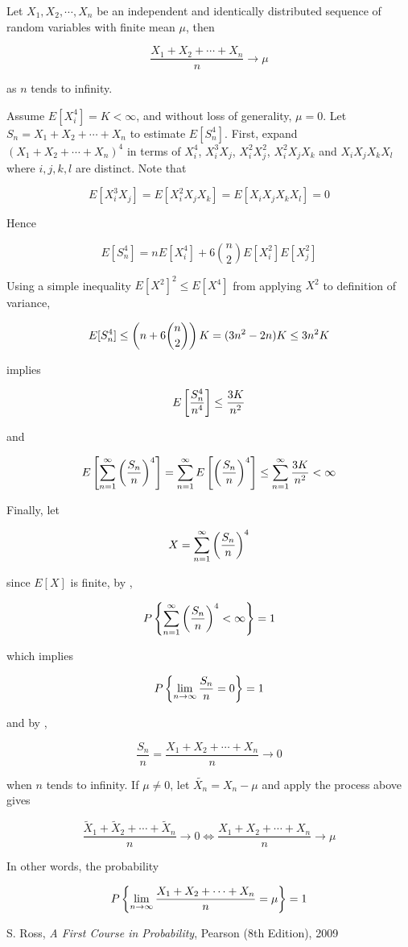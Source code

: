 \documentclass[a4paper,12pt]{article}
\begin{document}
\begin{thm}
  Let $X_{1},X_{2},\cdots,X_{n}$ be an independent and identically distributed sequence of random variables with finite mean $\mu$, then

  $$\frac{X_{1}+X_{2}+\cdots+X_{n}}{n}\to\mu$$\s

  as $n$ tends to infinity.\n

  \prf Assume $E[X_{i}^{4}]=K<\infty$, and without loss of generality, $\mu=0$. Let $S_{n}=X_{1}+X_{2}+\cdots+X_{n}$ to estimate $E[S_{n}^{4}]$. First, expand $(X_{1}+X_{2}+\cdots+X_{n})^{4}$ in terms of $X_{i}^{4}$, $X_{i}^{3}X_{j}$, $X_{i}^{2}X_{j}^{2}$, $X_{i}^{2}X_{j}X_{k}$ and $X_{i}X_{j}X_{k}X_{l}$ where $i,j,k,l$ are distinct. Note that

  $$E[X_{i}^{3}X_{j}]=E[X_{i}^{2}X_{j}X_{k}]=E[X_{i}X_{j}X_{k}X_{l}]=0$$\s

  Hence

  $$E[S_{n}^{4}]=nE[X_{i}^{4}]+6\binom{n}{2}E[X_{i}^{2}]E[X_{j}^{2}]$$\s

  Using a simple inequality $E[X^{2}]^{2}\leq E[X^{4}]$ from applying $X^{2}$ to definition of variance,

  $$E[S_{n}^{4}]\leq\left( n+6\binom{n}{2}\right)K=(3n^{2}-2n)K\leq 3n^{2}K$$\s

  implies

  $$E\left[ \frac{S_{n}^{4}}{n^{4}}\right]\leq\frac{3K}{n^{2}}$$\s

  and

  $$E\left[ \sum_{n=1}^{\infty}\left( \frac{S_{n}}{n}\right)^{4}\right]=\sum_{n=1}^{\infty}E\left[ \left( \frac{S_{n}}{n}\right)^{4}\right]\leq\sum_{n=1}^{\infty}\frac{3K}{n^{2}}<\infty$$\s

  Finally, let
  
  $$X=\sum_{n=1}^{\infty}\left( \frac{S_{n}}{n}\right)^{4}$$\s
  
  since $E[X]$ is finite, by \rpst[\sctd{1}],

  $$P\left\{ \sum_{n=1}^{\infty}\left( \frac{S_{n}}{n}\right)^{4}<\infty\right\}=1$$\s

  which implies

  $$P\left\{ \lim_{n\to\infty}\frac{S_{n}}{n}=0\right\}=1$$\s

  and by \rpst[\sctd{6}],

  $$\frac{S_{n}}{n}=\frac{X_{1}+X_{2}+\cdots+X_{n}}{n}\to 0$$\s

  when $n$ tends to infinity. If $\mu\neq 0$, let $\tilde{X_{n}}=X_{n}-\mu$ and apply the process above gives

  $$\frac{\tilde{X}_{1}+\tilde{X}_{2}+\cdots+\tilde{X}_{n}}{n}\to 0\Leftrightarrow\frac{X_{1}+X_{2}+\cdots+X_{n}}{n}\to\mu$$
\end{thm}\n

In other words, the probability

$$P\left\{ \lim_{n\to\infty}\frac{X_{1}+X_{2}+\cdots+X_{n}}{n}=\mu\right\}=1$$



\begin{reflist}
  \item S. Ross, \textit{A First Course in Probability}, Pearson (8th Edition), 2009
\end{reflist}
\end{document}
